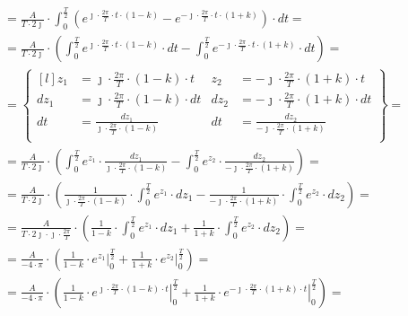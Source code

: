 \begin{task}
\begin{align*}
&=\frac{A}{T\cdot 2\jmath} \cdot \int_{0}^{\frac{T}{2}}
\left(e^{\jmath \cdot \frac{2\pi}{T} \cdot t \cdot \left(1 - k\right)} - e^{-\jmath \cdot \frac{2\pi}{T} \cdot t \cdot \left(1+k\right)} \right) \cdot dt=\\
&=\frac{A}{T\cdot 2\jmath} \cdot \left( \int_{0}^{\frac{T}{2}}
e^{\jmath \cdot \frac{2\pi}{T} \cdot t \cdot \left(1 - k\right)} \cdot dt - \int_{0}^{\frac{T}{2}} e^{-\jmath \cdot \frac{2\pi}{T} \cdot t \cdot \left(1+k\right)} \cdot dt \right)=\\
&=\begin{Bmatrix*}[l]
z_1&=\jmath \cdot \frac{2\pi}{T} \cdot \left(1 - k\right)\cdot t &z_2&=-\jmath \cdot \frac{2\pi}{T} \cdot \left(1+k\right)\cdot t\\
dz_1&=\jmath \cdot \frac{2\pi}{T} \cdot \left(1 - k\right)\cdot dt &dz_2&=-\jmath \cdot \frac{2\pi}{T} \cdot \left(1+k\right)\cdot dt\\
dt&=\frac{dz_1}{\jmath \cdot \frac{2\pi}{T} \cdot \left(1 - k\right)} &dt&=\frac{dz_2}{-\jmath \cdot \frac{2\pi}{T} \cdot \left(1+k\right)}\\
\end{Bmatrix*}=\\
&=\frac{A}{T\cdot 2\jmath} \cdot \left( \int_{0}^{\frac{T}{2}}
e^{z_1} \cdot \frac{dz_1}{\jmath \cdot \frac{2\pi}{T} \cdot \left(1 - k\right)} - \int_{0}^{\frac{T}{2}} e^{z_2} \cdot \frac{dz_2}{-\jmath \cdot \frac{2\pi}{T} \cdot \left(1+k\right)} \right)=\\
&=\frac{A}{T\cdot 2\jmath} \cdot \left( \frac{1}{\jmath \cdot \frac{2\pi}{T} \cdot \left(1 - k\right)} \cdot \int_{0}^{\frac{T}{2}}
e^{z_1} \cdot dz_1 - \frac{1}{-\jmath \cdot \frac{2\pi}{T} \cdot \left(1+k\right)} \cdot \int_{0}^{\frac{T}{2}} e^{z_2} \cdot dz_2 \right)=\\
&=\frac{A}{T\cdot 2\jmath \cdot \jmath \cdot \frac{2\pi}{T} } \cdot \left( \frac{1}{1 - k} \cdot \int_{0}^{\frac{T}{2}}
e^{z_1} \cdot dz_1 + \frac{1}{1+k} \cdot \int_{0}^{\frac{T}{2}} e^{z_2} \cdot dz_2 \right)=\\
&=\frac{A}{-4 \cdot \pi} \cdot \left( \frac{1}{1 - k} \cdot \left.
e^{z_1} \right|_{0}^{\frac{T}{2}} + \frac{1}{1+k} \cdot \left. e^{z_2} \right|_{0}^{\frac{T}{2}} \right)=\\
&=\frac{A}{-4 \cdot \pi} \cdot \left( \frac{1}{1 - k} \cdot \left.
e^{\jmath \cdot \frac{2\pi}{T} \cdot \left(1 - k\right)\cdot t} \right|_{0}^{\frac{T}{2}} + \frac{1}{1+k} \cdot \left. e^{-\jmath \cdot \frac{2\pi}{T} \cdot \left(1+k\right)\cdot t} \right|_{0}^{\frac{T}{2}} \right)=\\

\end{align*}
\end{task}
